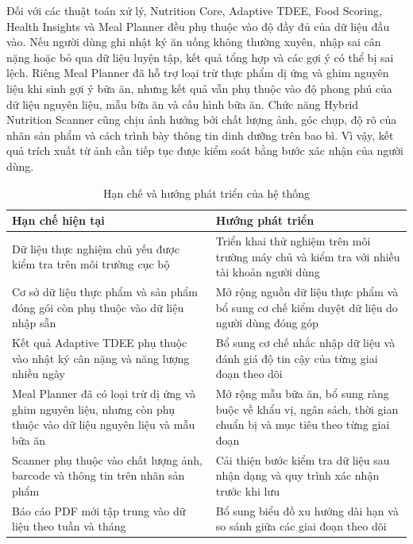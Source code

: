 \documentclass[12pt, a4paper]{report}
\begin{document}
Đối với các thuật toán xử lý, Nutrition Core, Adaptive TDEE, Food Scoring, Health Insights và Meal Planner đều phụ thuộc vào độ đầy đủ của dữ liệu đầu vào. Nếu người dùng ghi nhật ký ăn uống không thường xuyên, nhập sai cân nặng hoặc bỏ qua dữ liệu luyện tập, kết quả tổng hợp và các gợi ý có thể bị sai lệch. Riêng Meal Planner đã hỗ trợ loại trừ thực phẩm dị ứng và ghim nguyên liệu khi sinh gợi ý bữa ăn, nhưng kết quả vẫn phụ thuộc vào độ phong phú của dữ liệu nguyên liệu, mẫu bữa ăn và cấu hình bữa ăn. Chức năng Hybrid Nutrition Scanner cũng chịu ảnh hưởng bởi chất lượng ảnh, góc chụp, độ rõ của nhãn sản phẩm và cách trình bày thông tin dinh dưỡng trên bao bì. Vì vậy, kết quả trích xuất từ ảnh cần tiếp tục được kiểm soát bằng bước xác nhận của người dùng.

\begin{table}[htbp]
\centering
\caption{Hạn chế và hướng phát triển của hệ thống}
\begin{tabular}{|p{5cm}|p{10cm}|}
\hline
\textbf{Hạn chế hiện tại} & \textbf{Hướng phát triển} \\
\hline
Dữ liệu thực nghiệm chủ yếu được kiểm tra trên môi trường cục bộ & Triển khai thử nghiệm trên môi trường máy chủ và kiểm tra với nhiều tài khoản người dùng \\
\hline
Cơ sở dữ liệu thực phẩm và sản phẩm đóng gói còn phụ thuộc vào dữ liệu nhập sẵn & Mở rộng nguồn dữ liệu thực phẩm và bổ sung cơ chế kiểm duyệt dữ liệu do người dùng đóng góp \\
\hline
Kết quả Adaptive TDEE phụ thuộc vào nhật ký cân nặng và năng lượng nhiều ngày & Bổ sung cơ chế nhắc nhập dữ liệu và đánh giá độ tin cậy của từng giai đoạn theo dõi \\
\hline
Meal Planner đã có loại trừ dị ứng và ghim nguyên liệu, nhưng còn phụ thuộc vào dữ liệu nguyên liệu và mẫu bữa ăn & Mở rộng mẫu bữa ăn, bổ sung ràng buộc về khẩu vị, ngân sách, thời gian chuẩn bị và mục tiêu theo từng giai đoạn \\
\hline
Scanner phụ thuộc vào chất lượng ảnh, barcode và thông tin trên nhãn sản phẩm & Cải thiện bước kiểm tra dữ liệu sau nhận dạng và quy trình xác nhận trước khi lưu \\
\hline
Báo cáo PDF mới tập trung vào dữ liệu theo tuần và tháng & Bổ sung biểu đồ xu hướng dài hạn và so sánh giữa các giai đoạn theo dõi \\
\hline
\end{tabular}
\end{table}
\end{document}
